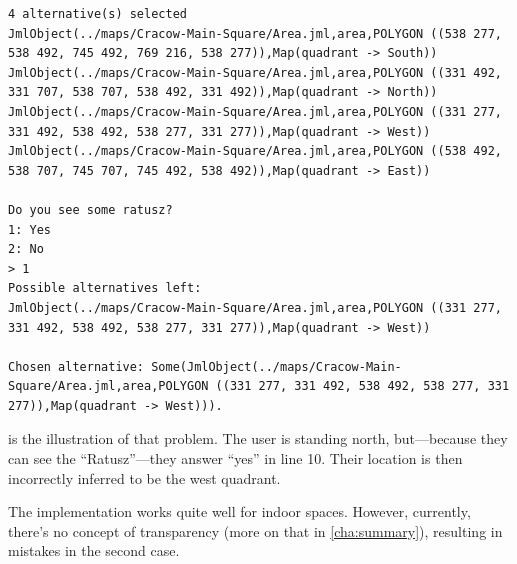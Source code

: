 \begin{lstlisting}[label={lst:case-cracow-two},caption={Mediation between all 4 quadrants. User is in the north one.}]
4 alternative(s) selected
JmlObject(../maps/Cracow-Main-Square/Area.jml,area,POLYGON ((538 277, 538 492, 745 492, 769 216, 538 277)),Map(quadrant -> South))
JmlObject(../maps/Cracow-Main-Square/Area.jml,area,POLYGON ((331 492, 331 707, 538 707, 538 492, 331 492)),Map(quadrant -> North))
JmlObject(../maps/Cracow-Main-Square/Area.jml,area,POLYGON ((331 277, 331 492, 538 492, 538 277, 331 277)),Map(quadrant -> West))
JmlObject(../maps/Cracow-Main-Square/Area.jml,area,POLYGON ((538 492, 538 707, 745 707, 745 492, 538 492)),Map(quadrant -> East))

Do you see some ratusz?
1: Yes
2: No
> 1
Possible alternatives left:
JmlObject(../maps/Cracow-Main-Square/Area.jml,area,POLYGON ((331 277, 331 492, 538 492, 538 277, 331 277)),Map(quadrant -> West))

Chosen alternative: Some(JmlObject(../maps/Cracow-Main-Square/Area.jml,area,POLYGON ((331 277, 331 492, 538 492, 538 277, 331 277)),Map(quadrant -> West))).
\end{lstlisting}

 is the illustration of that problem. The user is standing north, but---because they can see the ``Ratusz''---they answer ``yes'' in line 10. Their location is then incorrectly inferred to be the west quadrant.

The implementation works quite well for indoor spaces. However, currently, there's no concept of transparency (more on that in \cref{cha:summary}), resulting in mistakes in the second case.
